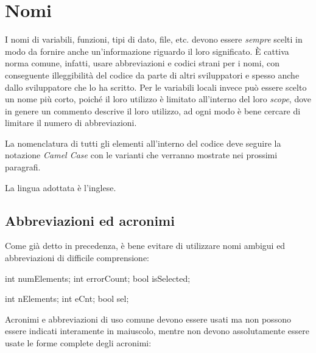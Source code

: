 %
%

\section{Nomi}\label{sec:name}

I nomi di variabili, funzioni, tipi di dato, file, etc. devono essere \emph{sempre} scelti in modo da fornire anche un'informazione riguardo il loro significato.
È cattiva norma comune, infatti, usare abbreviazioni e codici strani per i nomi, con conseguente illeggibilità del codice da parte di altri sviluppatori e spesso anche dallo sviluppatore che lo ha scritto.
Per le variabili locali invece può essere scelto un nome più corto, poiché il loro utilizzo è limitato all'interno del loro \emph{scope}, dove in genere un commento descrive il loro utilizzo, ad ogni modo è bene cercare di limitare il numero di abbreviazioni. 

La nomenclatura di tutti gli elementi all'interno del codice deve seguire la notazione \emph{Camel Case}\cite{codestyle:camel} con le varianti che verranno mostrate nei prossimi paragrafi.

La lingua adottata è l'inglese.

\subsection{Abbreviazioni ed acronimi}\label{ssec:abbreviations}

Come già detto in precedenza, è bene evitare di utilizzare nomi ambigui ed abbreviazioni di difficile comprensione:

\begin{minipage}[t]{\cbwidth}
\begin{RightCode}
int numElements;
int errorCount;
bool isSelected;
\end{RightCode}
\end{minipage}%
\hspace{\cbdistance}
\begin{minipage}[t]{\cbwidth}
\begin{ErrorCode}
int nElements;
int eCnt;
bool sel;
\end{ErrorCode}
\end{minipage}

Acronimi e abbreviazioni di uso comune devono essere usati ma non possono essere indicati interamente in maiuscolo, mentre non devono assolutamente essere usate le forme complete degli acronimi:

